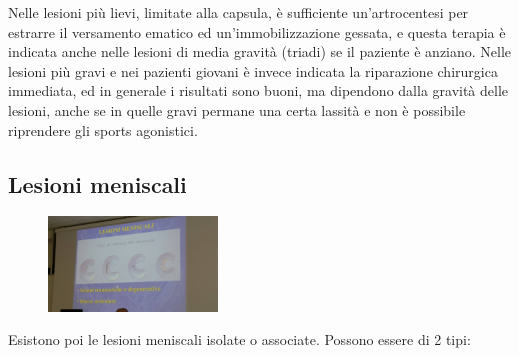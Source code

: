 Nelle lesioni più lievi, limitate alla capsula, è sufficiente un'artrocentesi per estrarre il versamento ematico ed un'immobilizzazione gessata, e questa terapia è indicata anche nelle lesioni di media gravità (triadi) se il paziente è anziano. Nelle lesioni più gravi e nei pazienti giovani è invece indicata la riparazione chirurgica immediata, ed in generale i risultati sono buoni, ma dipendono dalla gravità delle lesioni, anche se in quelle gravi permane una certa lassità e non è possibile riprendere gli sports agonistici.

\subsection{Lesioni meniscali}

\begin{figure}[!ht]
\centering
\includegraphics[width=0.4\textwidth]{008/image9.jpeg}
\end{figure}

Esistono poi le lesioni meniscali isolate o associate. Possono essere di 2 tipi:

